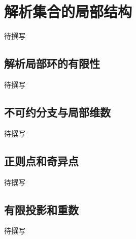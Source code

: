 
% 
% 

\section{解析集合的局部结构}
\label{g4:sec:1403}

待撰写

\subsection{解析局部环的有限性}
\label{g4:subsec:1403:01}
待撰写

\subsection{不可约分支与局部维数}
\label{g4:subsec:1403:02}
待撰写

\subsection{正则点和奇异点}
\label{g4:subsec:1403:03}
待撰写

\subsection{有限投影和重数}
\label{g4:subsec:1403:04}
待撰写

